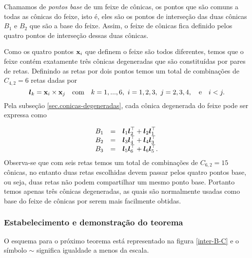 Chamamos de {\it pontos base} de um feixe de cônicas, os pontos que são comuns a todas as cônicas do feixe, isto é, eles são os pontos de interseção das duas cônicas $B_1$ e $B_2$ que são a base do feixe. Assim, o feixe de cônicas fica definido pelos quatro pontos de interseção dessas duas cônicas.

Como os quatro pontos $\mathbf{x}_i$ que definem o feixe são todos diferentes, temos que o feixe contém exatamente três cônicas degeneradas que são constituídas por pares de retas. Definindo as retas por dois pontos temos um total de combinações de $C_{4,2}=6$ retas dadas por
\begin{equation*}
\boldsymbol{l}_k=\mathbf{x}_i\times\mathbf{x}_j\quad\text{com}\quad k=1,...,6,\,\,i=1,2,3,\,\,j=2,3,4,\quad\text{e}\quad i<j.
\end{equation*}
Pela subseção \ref{sec.conicas-degeneradas}, cada cônica degenerada do feixe pode ser expressa como

\begin{equation}
\begin{array}{rcl}
B_1&=&\boldsymbol{l}_1\boldsymbol{l}_2^\top+\boldsymbol{l}_2\boldsymbol{l}_1^\top\\
B_2&=&\boldsymbol{l}_3\boldsymbol{l}_4^\top+\boldsymbol{l}_4\boldsymbol{l}_3^\top\\
B_3&=&\boldsymbol{l}_5\boldsymbol{l}_6^\top+\boldsymbol{l}_6\boldsymbol{l}_5^\top.
\end{array}
\end{equation}
Observa-se que com seis retas temos um total de combinações de $C_{6,2}=15$ cônicas, no entanto duas retas escolhidas devem passar pelos quatro pontos base, ou seja, duas retas não podem compartilhar um mesmo ponto base. Portanto temos apenas três cônicas degeneradas, as quais são normalmente usadas como base do feixe de cônicas por serem mais facilmente obtidas.
 
\subsubsection{Estabelecimento e demonstração do teorema}\label{sec.teorema-7}

O esquema para o próximo teorema está representado na figura \ref{inter-B-C} e o símbolo $\sim$ significa igualdade a menos da escala.

